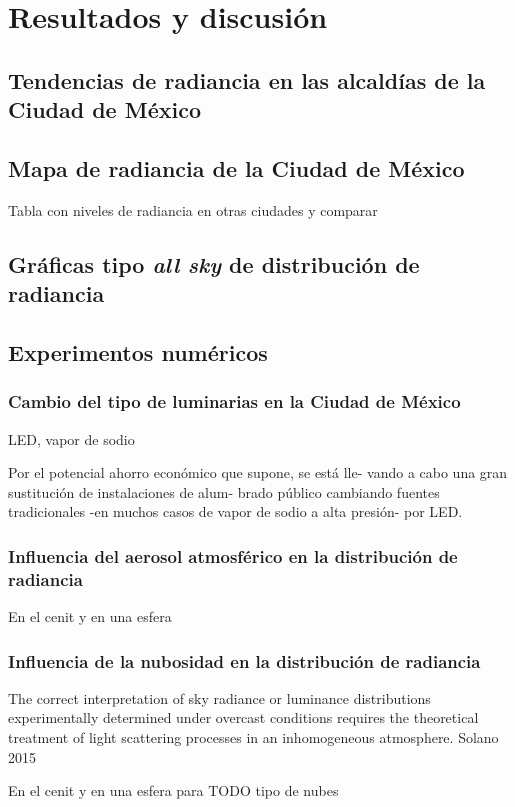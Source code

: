 \chapter{Resultados y discusión}

\section{Tendencias de radiancia en las alcaldías de la Ciudad de México}

\section{Mapa de radiancia de la Ciudad de México}

Tabla con niveles de radiancia en otras ciudades y comparar

\section{Gráficas tipo \textit{all sky} de distribución de radiancia}

\section{Experimentos numéricos}

\subsection{Cambio del tipo de luminarias en la Ciudad de México}

LED, vapor de sodio

Por el potencial ahorro económico que supone, se está lle-
vando a cabo una gran sustitución de instalaciones de alum-
brado público cambiando fuentes tradicionales -en muchos
casos de vapor de sodio a alta presión- por LED.

\subsection{Influencia del aerosol atmosférico en la distribución de radiancia}

En el cenit y en una esfera

\subsection{Influencia de la nubosidad en la distribución de radiancia}

The correct interpretation of sky radiance
or luminance distributions experimentally
determined under overcast conditions
requires the theoretical treatment of light
scattering processes in an inhomogeneous
atmosphere. Solano 2015

En el cenit y en una esfera para TODO tipo de nubes